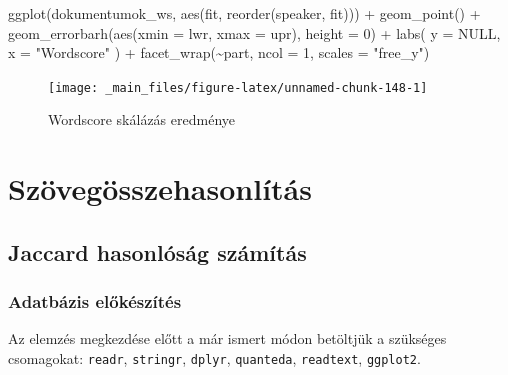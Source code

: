 \documentclass[
]{book}
\newenvironment{Shaded}{\begin{snugshade}}{\end{snugshade}}
\newcommand{\AttributeTok}[1]{\textcolor[rgb]{0.77,0.63,0.00}{#1}}
\newcommand{\ConstantTok}[1]{\textcolor[rgb]{0.00,0.00,0.00}{#1}}
\newcommand{\DecValTok}[1]{\textcolor[rgb]{0.00,0.00,0.81}{#1}}
\newcommand{\FunctionTok}[1]{\textcolor[rgb]{0.00,0.00,0.00}{#1}}
\newcommand{\NormalTok}[1]{#1}
\newcommand{\SpecialCharTok}[1]{\textcolor[rgb]{0.00,0.00,0.00}{#1}}
\newcommand{\StringTok}[1]{\textcolor[rgb]{0.31,0.60,0.02}{#1}}
\begin{document}
\begin{Shaded}
\begin{Highlighting}[]

\FunctionTok{ggplot}\NormalTok{(dokumentumok\_ws, }\FunctionTok{aes}\NormalTok{(fit, }\FunctionTok{reorder}\NormalTok{(speaker, fit))) }\SpecialCharTok{+}
  \FunctionTok{geom\_point}\NormalTok{() }\SpecialCharTok{+}
  \FunctionTok{geom\_errorbarh}\NormalTok{(}\FunctionTok{aes}\NormalTok{(}\AttributeTok{xmin =}\NormalTok{ lwr, }\AttributeTok{xmax =}\NormalTok{ upr), }\AttributeTok{height =} \DecValTok{0}\NormalTok{) }\SpecialCharTok{+}
  \FunctionTok{labs}\NormalTok{(}
    \AttributeTok{y =} \ConstantTok{NULL}\NormalTok{,}
    \AttributeTok{x =} \StringTok{"Wordscore"}
\NormalTok{  ) }\SpecialCharTok{+}
  \FunctionTok{facet\_wrap}\NormalTok{(}\SpecialCharTok{\textasciitilde{}}\NormalTok{part, }\AttributeTok{ncol =} \DecValTok{1}\NormalTok{, }\AttributeTok{scales =} \StringTok{"free\_y"}\NormalTok{)}
\end{Highlighting}
\end{Shaded}

\begin{figure}

{\centering \texttt{[image: \_main\_files/figure-latex/unnamed-chunk-148-1]} 

}

\caption{Wordscore skálázás eredménye}\label{fig:unnamed-chunk-148}
\end{figure}

\hypertarget{szuxf6veguxf6sszehasonluxedtuxe1s}{%
\chapter{Szövegösszehasonlítás}\label{szuxf6veguxf6sszehasonluxedtuxe1s}}

\hypertarget{jaccard-hasonluxf3suxe1g-szuxe1muxedtuxe1s}{%
\section{Jaccard hasonlóság
számítás}\label{jaccard-hasonluxf3suxe1g-szuxe1muxedtuxe1s}}

\hypertarget{adatbuxe1zis-elux151kuxe9szuxedtuxe9s}{%
\subsection{Adatbázis
előkészítés}\label{adatbuxe1zis-elux151kuxe9szuxedtuxe9s}}

Az elemzés megkezdése előtt a már ismert módon betöltjük a szükséges
csomagokat: \texttt{readr}, \texttt{stringr}, \texttt{dplyr},
\texttt{quanteda}, \texttt{readtext}, \texttt{ggplot2}.
\end{document}
